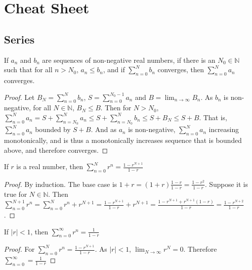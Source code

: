             \section{Cheat Sheet}
            \subsection{Series}
            \begin{theorem}
                If $a_n$ and $b_n$ are sequences of non-negative real numbers, if there is
                an $N_0\in \mathbb{N}$ such that for all $n>N_0$, $a_n\leq b_n$, and if
                $\sum_{n=0}^{N}b_n$ converges, then $\sum_{n=0}^{N}a_n$ converges.
            \end{theorem}
            \begin{proof}
                Let $B_N=\sum_{n=0}^{N}b_n$, $S = \sum_{n=0}^{N_{0}-1}a_n$ and
                $B=\lim_{n\rightarrow \infty}B_{n}$. As $b_n$ is non-negative, for all $N\in \mathbb{N}$, $B_{N} \leq B$. Then for $N>N_{0}$, $\sum_{n=0}^{N}a_n = S+\sum_{n=N_{0}}^{N}a_n \leq S+\sum_{n=N_{0}}^{N}b_n \leq S+B_{N} \leq S+B$. That is, $\sum_{n=0}^{N}a_n$ bounded by $S+B$. And as $a_n$ is non-negative, $\sum_{n=0}^{N}a_n$ increasing monotonically, and is thus a monotonically increases sequence that is bounded above, and therefore converges.
            \end{proof}
            \begin{theorem}
            If $r$ is a real number, then $\sum_{n=0}^{N} r^n = \frac{1-r^{N+1}}{1-r}$
            \end{theorem}
            \begin{proof}
            By induction. The base case is $1+r = (1+r)\frac{1-r}{1-r} = \frac{1-r^2}{1-r}$. Suppose it is true for $N \in \mathbb{N}$. Then $\sum_{n=0}^{N+1}r^n=\sum_{n=0}^{N}r^n+r^{N+1}= \frac{1-r^{N+1}}{1-r}+r^{N+1}=\frac{1-r^{N+1}+r^{N+1}(1-r)}{1-r}=\frac{1-r^{N+2}}{1-r}$.
            \end{proof}
            \begin{theorem}
            If $|r|<1$, then $\sum_{n=0}^{\infty} r^n = \frac{1}{1-r}$
            \end{theorem}
            \begin{proof}
            For $\sum_{n=0}^{N}r^{n}=\frac{1-r^{N+1}}{1-r}$. As $|r|<1$, $\lim_{N\rightarrow \infty}r^{N}=0$. Therefore $\sum_{n=0}^{\infty}=\frac{1}{1-r}$
            \end{proof}
